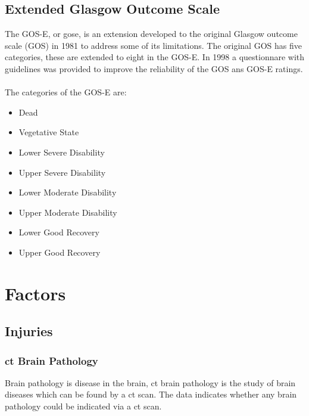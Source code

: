 \documentclass[11pt]{article}
\begin{document}
\subsection{Extended Glasgow Outcome Scale}
The GOS-E, or \gls{gose}, is an extension developed to the original Glasgow outcome scale (GOS) in 1981 to address some of its limitations. The original GOS has five categories, these are extended to eight in the GOS-E. In 1998 a questionnare with guidelines was provided to improve the reliability of the GOS ans GOS-E ratings\cite{GOSEExtendedGlasgow}.\cite{ExtendedGlasgowOutcome}\\
\\
The categories of the GOS-E are:
\begin{itemize}
  \item{Dead}
  \item{Vegetative State}
  \item{Lower Severe Disability}
  \item{Upper Severe Disability}
  \item{Lower Moderate Disability}
  \item{Upper Moderate Disability}
  \item{Lower Good Recovery}
  \item{Upper Good Recovery}
\end{itemize}



\section{Factors}

\subsection{Injuries}

\subsubsection{\gls{ct} Brain Pathology}
Brain pathology is disease in the brain, \gls{ct} brain pathology is the study of brain diseases which can be found by a \gls{ct} scan.
The data indicates whether any brain pathology could be indicated via a \gls{ct} scan.
\end{document}

